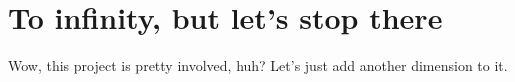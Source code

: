 \documentclass[twocolumn]{article}
\begin{document}


\section{To infinity, but let's stop there}

Wow, this project is pretty involved, huh? Let's just add another
dimension to it.



\end{document}
